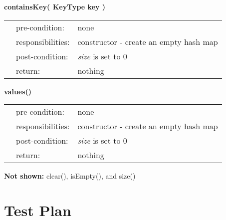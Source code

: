 \documentclass[12pt,letterpaper]{article}
\begin{document}
\textbf{containsKey( KeyType key )} \\
\begin{listliketab} 
        \begin{tabular}{Lll}
            & pre-condition:    & none \\
            & responsibilities: & constructor - create an empty hash map \\
            & post-condition:   & \emph{size} is set to 0 \\
            & return:           & nothing
        \end{tabular} 
    \end{listliketab}
    
\textbf{values()} \\
\begin{listliketab} 
        \begin{tabular}{Lll}
            & pre-condition:    & none \\
            & responsibilities: & constructor - create an empty hash map \\
            & post-condition:   & \emph{size} is set to 0 \\
            & return:           & nothing
        \end{tabular} 
    \end{listliketab}
    
    

\textbf{Not shown:} clear(), isEmpty(), and size()

\section*{Test Plan}


\begin{table}[htbp]
\caption{Instantiation of a \textbf{Distance} object using default values for the attributes.}
\begin{center}
\noindent{}
\end{center}
\end{table}


\end{document}
